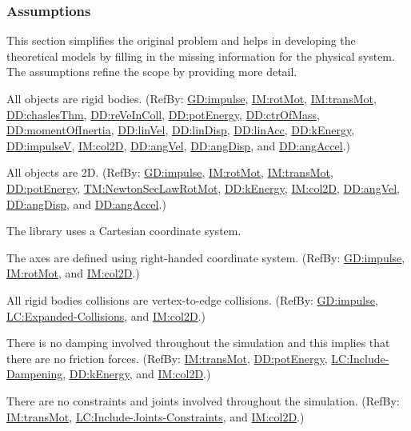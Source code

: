 \documentclass[12pt]{article}
\begin{document}
\subsubsection{Assumptions}
\label{Sec:Assumps}
This section simplifies the original problem and helps in developing the theoretical models by filling in the missing information for the physical system. The assumptions refine the scope by providing more detail.

\begin{description}[font=\normalfont]
\item[objectTy:\phantomsection\label{assumpOT}]{All objects are rigid bodies. (RefBy: \hyperref[GD:impulse]{GD:impulse}, \hyperref[IM:rotMot]{IM:rotMot}, \hyperref[IM:transMot]{IM:transMot}, \hyperref[DD:chaslesThm]{DD:chaslesThm}, \hyperref[DD:reVeInColl]{DD:reVeInColl}, \hyperref[DD:potEnergy]{DD:potEnergy}, \hyperref[DD:ctrOfMass]{DD:ctrOfMass}, \hyperref[DD:momentOfInertia]{DD:momentOfInertia}, \hyperref[DD:linVel]{DD:linVel}, \hyperref[DD:linDisp]{DD:linDisp}, \hyperref[DD:linAcc]{DD:linAcc}, \hyperref[DD:kEnergy]{DD:kEnergy}, \hyperref[DD:impulseV]{DD:impulseV}, \hyperref[IM:col2D]{IM:col2D}, \hyperref[DD:angVel]{DD:angVel}, \hyperref[DD:angDisp]{DD:angDisp}, and \hyperref[DD:angAccel]{DD:angAccel}.)}
\item[objectDimension:\phantomsection\label{assumpOD}]{All objects are 2D. (RefBy: \hyperref[GD:impulse]{GD:impulse}, \hyperref[IM:rotMot]{IM:rotMot}, \hyperref[IM:transMot]{IM:transMot}, \hyperref[DD:potEnergy]{DD:potEnergy}, \hyperref[TM:NewtonSecLawRotMot]{TM:NewtonSecLawRotMot}, \hyperref[DD:kEnergy]{DD:kEnergy}, \hyperref[IM:col2D]{IM:col2D}, \hyperref[DD:angVel]{DD:angVel}, \hyperref[DD:angDisp]{DD:angDisp}, and \hyperref[DD:angAccel]{DD:angAccel}.)}
\item[coordinateSystemTy:\phantomsection\label{assumpCST}]{The library uses a Cartesian coordinate system.}
\item[axesDefined:\phantomsection\label{assumpAD}]{The axes are defined using right-handed coordinate system. (RefBy: \hyperref[GD:impulse]{GD:impulse}, \hyperref[IM:rotMot]{IM:rotMot}, and \hyperref[IM:col2D]{IM:col2D}.)}
\item[collisionType:\phantomsection\label{assumpCT}]{All rigid bodies collisions are vertex-to-edge collisions. (RefBy: \hyperref[GD:impulse]{GD:impulse}, \hyperref[lcEC]{LC:Expanded-Collisions}, and \hyperref[IM:col2D]{IM:col2D}.)}
\item[dampingInvolvement:\phantomsection\label{assumpDI}]{There is no damping involved throughout the simulation and this implies that there are no friction forces. (RefBy: \hyperref[IM:transMot]{IM:transMot}, \hyperref[DD:potEnergy]{DD:potEnergy}, \hyperref[lcID]{LC:Include-Dampening}, \hyperref[DD:kEnergy]{DD:kEnergy}, and \hyperref[IM:col2D]{IM:col2D}.)}
\item[constraintsAndJointsInvolvement:\phantomsection\label{assumpCAJI}]{There are no constraints and joints involved throughout the simulation. (RefBy: \hyperref[IM:transMot]{IM:transMot}, \hyperref[lcIJC]{LC:Include-Joints-Constraints}, and \hyperref[IM:col2D]{IM:col2D}.)}
\end{description}
\end{document}
